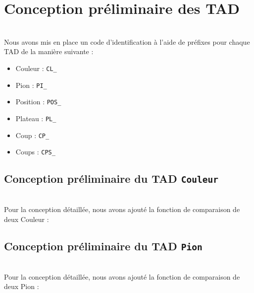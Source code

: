 
\chapter{Conception préliminaire des TAD}
~\\
Nous avons mis en place un code d'identification à l'aide de préfixes pour chaque TAD de la manière suivante :
\begin{itemize}
 \item Couleur : \tt{CL\_}
 \item Pion : \tt{PI\_}
 \item Position : \tt{POS\_}
 \item Plateau : \tt{PL\_}
 \item Coup : \tt{CP\_}
 \item Coups : \tt{CPS\_}
\end{itemize}


\section{Conception préliminaire du TAD \tt{Couleur}}
\begin{itemize}
\end{itemize}

~\\
Pour la conception détaillée, nous avons ajouté la fonction de comparaison de deux \og Couleur \fg{}  :
\begin{itemize}
\end{itemize}

\section{Conception préliminaire du TAD \tt{Pion}}
\begin{itemize}
\end{itemize}

~\\
Pour la conception détaillée, nous avons ajouté la fonction de comparaison de deux \og Pion \fg{}  :
\begin{itemize}
\end{itemize}

